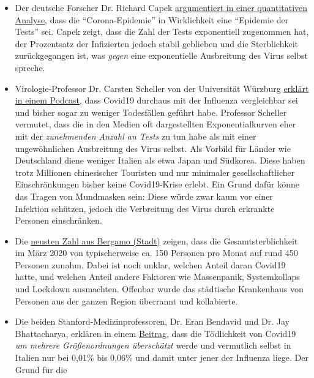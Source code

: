 \begin{itemize}
\tightlist
\item
  Der deutsche Forscher Dr. Richard Capek
  \href{https://coronadaten.wordpress.com/}{argumentiert in einer
  quantitativen Analyse}, dass die ``Corona-Epidemie'' in Wirklichkeit
  eine ``Epidemie der Tests'' sei. Capek zeigt, dass die Zahl der Tests
  exponentiell zugenommen hat, der Prozentsatz der Infizierten jedoch
  stabil geblieben und die Sterblichkeit zurückgegangen ist, was
  \emph{gegen} eine exponentielle Ausbreitung des Virus selbst spreche.
\item
  Virologie-Professor Dr. Carsten Scheller von der Universität Würzburg
  \href{https://www.youtube.com/watch?v=w-uub0urNfw}{erklärt in einem
  Podcast}, dass Covid19 durchaus mit der Influenza vergleichbar sei und
  bisher sogar zu weniger Todesfällen geführt habe. Professor Scheller
  vermutet, dass die in den Medien oft dargestellten Exponential­kurven
  eher mit der \emph{zunehmenden Anzahl an Tests} zu tun habe als mit
  einer ungewöhnlichen Ausbreitung des Virus selbst. Als Vorbild für
  Länder wie Deutschland diene weniger Italien als etwa Japan und
  Südkorea. Diese haben trotz Millionen chinesischer Touristen und nur
  minimaler gesellschaftlicher Einschränkungen bisher keine
  Covid19-Krise erlebt. Ein Grund dafür könne das Tragen von Mundmasken
  sein: Diese würde zwar kaum vor einer Infektion schützen, jedoch die
  Verbreitung des Virus durch erkrankte Personen einschränken.
\item
  Die
  \href{https://www.ecodibergamo.it/stories/bergamo-citta/a-bergamo-decessi-4-volte-oltre-la-medialeco-lancia-unindagine-nei-comuni_1346651_11/}{neusten
  Zahl aus Bergamo (Stadt)} zeigen, dass die Gesamtsterblichkeit im März
  2020 von typischerweise ca. 150 Personen pro Monat auf rund 450
  Personen zunahm. Dabei ist noch unklar, welchen Anteil daran Covid19
  hatte, und welchen Anteil andere Faktoren wie Massenpanik,
  Systemkollaps und Lockdown ausmachten. Offenbar wurde das städtische
  Krankenhaus von Personen aus der ganzen Region überrannt und
  kollabierte.
\item
  Die beiden Stanford-Medizinprofessoren, Dr. Eran Bendavid und Dr. Jay
  Bhattacharya, erklären in einem
  \href{https://web.archive.org/web/20200325103650/https://www.wsj.com/articles/is-the-coronavirus-as-deadly-as-they-say-11585088464}{Beitrag},
  dass die Tödlichkeit von Covid19 \emph{um mehrere Größenordnungen
  überschätzt} werde und vermutlich selbst in Italien nur bei 0,01\% bis
  0,06\% und damit unter jener der Influenza liege. Der Grund für die

\end{itemize}
